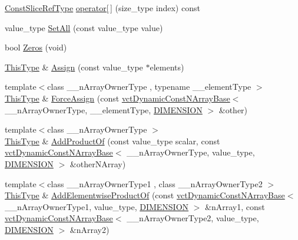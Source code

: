 \begin{DoxyCompactItemize}
\hyperlink{classvct_dynamic_const_n_array_base_ad4a09eb0789ba4c5b8d799fbe0ee3d79}{Const\+Slice\+Ref\+Type} \hyperlink{classvct_dynamic_n_array_base_a57164e18fbbcd86894b3e6df8950f0c7}{operator\mbox{[}$\,$\mbox{]}} (size\+\_\+type index) const 
\item 
value\+\_\+type \hyperlink{classvct_dynamic_n_array_base_a4f0285807b627852ebd8ab0ac3ef3fec}{Set\+All} (const value\+\_\+type value)
\item 
bool \hyperlink{classvct_dynamic_n_array_base_ac1cddb3277bd7ff287b3029ce7d3f96a}{Zeros} (void)
\item 
\hyperlink{classvct_dynamic_const_n_array_base_a5123caffcf1455a1b99003877eade897}{This\+Type} \& \hyperlink{classvct_dynamic_n_array_base_a4c61f0aa5815a95536dd6b28e9cde4cc}{Assign} (const value\+\_\+type $\ast$elements)
\item 
{\footnotesize template$<$class \+\_\+\+\_\+n\+Array\+Owner\+Type , typename \+\_\+\+\_\+element\+Type $>$ }\\\hyperlink{classvct_dynamic_const_n_array_base_a5123caffcf1455a1b99003877eade897}{This\+Type} \& \hyperlink{classvct_dynamic_n_array_base_a1ed6220b294edbd63633ca6f2134e87b}{Force\+Assign} (const \hyperlink{classvct_dynamic_const_n_array_base}{vct\+Dynamic\+Const\+N\+Array\+Base}$<$ \+\_\+\+\_\+n\+Array\+Owner\+Type, \+\_\+\+\_\+element\+Type, \hyperlink{classvct_dynamic_n_array_base_aa66532d28588bdf26d08fb593db815d6abfcde386ec801b212d7c42d63a4f3837}{D\+I\+M\+E\+N\+S\+I\+O\+N} $>$ \&other)
\item 
{\footnotesize template$<$class \+\_\+\+\_\+n\+Array\+Owner\+Type $>$ }\\\hyperlink{classvct_dynamic_const_n_array_base_a5123caffcf1455a1b99003877eade897}{This\+Type} \& \hyperlink{classvct_dynamic_n_array_base_a77dcddd52be300f4bd8859c5409496d0}{Add\+Product\+Of} (const value\+\_\+type scalar, const \hyperlink{classvct_dynamic_const_n_array_base}{vct\+Dynamic\+Const\+N\+Array\+Base}$<$ \+\_\+\+\_\+n\+Array\+Owner\+Type, value\+\_\+type, \hyperlink{classvct_dynamic_n_array_base_aa66532d28588bdf26d08fb593db815d6abfcde386ec801b212d7c42d63a4f3837}{D\+I\+M\+E\+N\+S\+I\+O\+N} $>$ \&other\+N\+Array)
\item 
{\footnotesize template$<$class \+\_\+\+\_\+n\+Array\+Owner\+Type1 , class \+\_\+\+\_\+n\+Array\+Owner\+Type2 $>$ }\\\hyperlink{classvct_dynamic_const_n_array_base_a5123caffcf1455a1b99003877eade897}{This\+Type} \& \hyperlink{classvct_dynamic_n_array_base_aabfddcad178acd2d6d3097e39391e6e0}{Add\+Elementwise\+Product\+Of} (const \hyperlink{classvct_dynamic_const_n_array_base}{vct\+Dynamic\+Const\+N\+Array\+Base}$<$ \+\_\+\+\_\+n\+Array\+Owner\+Type1, value\+\_\+type, \hyperlink{classvct_dynamic_n_array_base_aa66532d28588bdf26d08fb593db815d6abfcde386ec801b212d7c42d63a4f3837}{D\+I\+M\+E\+N\+S\+I\+O\+N} $>$ \&n\+Array1, const \hyperlink{classvct_dynamic_const_n_array_base}{vct\+Dynamic\+Const\+N\+Array\+Base}$<$ \+\_\+\+\_\+n\+Array\+Owner\+Type2, value\+\_\+type, \hyperlink{classvct_dynamic_n_array_base_aa66532d28588bdf26d08fb593db815d6abfcde386ec801b212d7c42d63a4f3837}{D\+I\+M\+E\+N\+S\+I\+O\+N} $>$ \&n\+Array2)
\end{DoxyCompactItemize}
